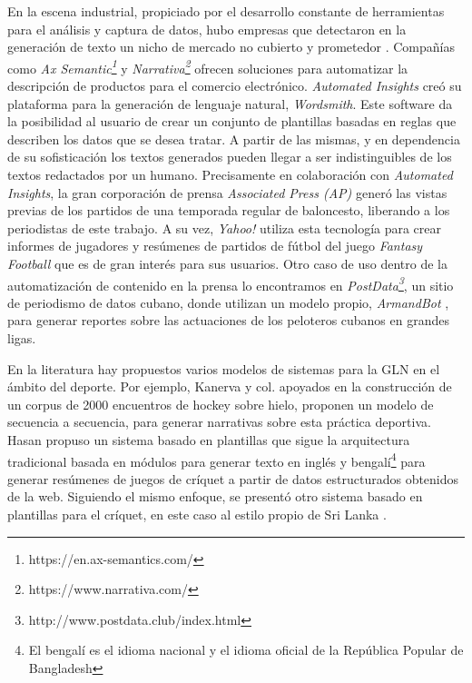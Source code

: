     En la escena industrial, propiciado por el desarrollo constante de herramientas para el análisis y captura de datos,
hubo empresas que detectaron en la generación de texto un nicho de mercado no cubierto y prometedor . Compañías como \textit{Ax Semantic\footnote[1]{https://en.ax-semantics.com/}} y 
\textit{Narrativa\footnote[2]{https://www.narrativa.com/}} ofrecen soluciones para automatizar la descripción de productos para el comercio electrónico. 
\textit{Automated Insights} creó su plataforma para la generación de lenguaje natural, \textit{Wordsmith}. Este software da la posibilidad al usuario de crear un conjunto 
de plantillas basadas en reglas que describen los datos que se desea tratar. A partir de las mismas, y en dependencia de su sofisticación los textos generados pueden llegar a ser 
indistinguibles de los textos redactados por un humano. Precisamente en colaboración con \textit{Automated Insights}, la gran corporación de prensa \textit{Associated Press (AP)} generó
las vistas previas de los partidos de una temporada regular de baloncesto, liberando a los periodistas de este trabajo. A su vez, \textit{Yahoo!} utiliza esta tecnología para crear informes 
de jugadores y resúmenes de partidos de fútbol del juego \textit{Fantasy Football} que es de gran interés para sus usuarios. Otro caso de uso dentro de la automatización de contenido en la prensa lo encontramos en
\textit{PostData\footnote[3]{http://www.postdata.club/index.html}}, un sitio de periodismo 
de datos cubano, donde utilizan un modelo propio, \textit{ArmandBot} , para generar reportes sobre las actuaciones de los peloteros cubanos en grandes ligas.

    En la literatura hay propuestos varios modelos de sistemas para la GLN en el ámbito del deporte. Por ejemplo, Kanerva y col.  apoyados en la construcción de un corpus de 2000 encuentros de hockey sobre hielo, 
proponen un modelo de secuencia a secuencia, para generar narrativas sobre esta práctica deportiva. Hasan  propuso un sistema basado en plantillas que sigue la arquitectura tradicional basada en módulos para 
generar texto en inglés y bengalí\footnote[5]{El bengalí es el idioma nacional y el idioma oficial de la República Popular de Bangladesh} para generar resúmenes de juegos de críquet a partir de datos estructurados obtenidos de la web. 
Siguiendo el mismo enfoque, se presentó otro sistema basado en plantillas para el críquet, en este caso al estilo propio de Sri Lanka .
 
